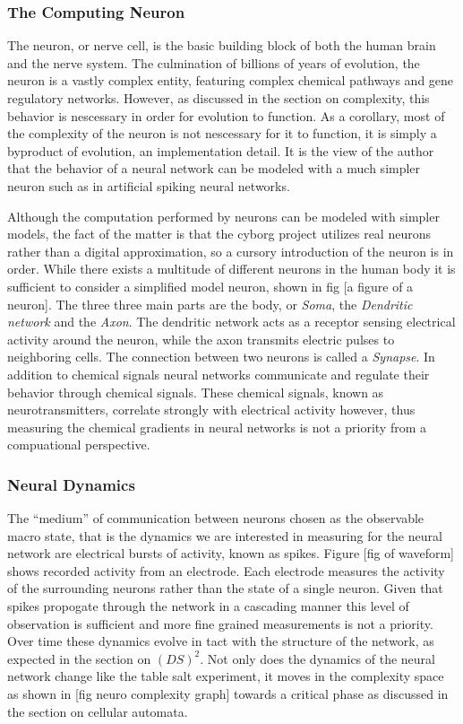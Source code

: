 \subsubsection{The Computing Neuron}
The neuron, or nerve cell, is the basic building block of both the human brain
and the nerve system.
The culmination of billions of years of evolution, the neuron is a vastly
complex entity, featuring complex chemical pathways and gene regulatory
networks.
However, as discussed in the section on complexity, this behavior is nescessary
in order for evolution to function.
As a corollary, most of the complexity of the neuron is not nescessary for it to
function, it is simply a byproduct of evolution, an implementation detail.
It is the view of the author that the behavior of a neural network can be
modeled with a much simpler neuron such as in artificial spiking neural
networks.\par
Although the computation performed by neurons can be modeled with simpler
models, the fact of the matter is that the cyborg project utilizes real neurons
rather than a digital approximation, so a cursory introduction of the neuron is
in order.
While there exists a multitude of different neurons in the human body it is
sufficient to consider a simplified model neuron, shown in fig [a figure of a
neuron].
The three three main parts are the body, or \emph{Soma}, the \emph{Dendritic
  network} and the \emph{Axon}. 
The dendritic network acts as a receptor sensing electrical activity around the
neuron, while the axon transmits electric pulses to neighboring cells.
The connection between two neurons is called a \emph{Synapse}.
%
In addition to chemical signals neural networks communicate and regulate their
behavior through chemical signals.
These chemical signals, known as neurotransmitters, correlate strongly with
electrical activity however, thus measuring the chemical gradients in neural
networks is not a priority from a compuational perspective.
\subsubsection{Neural Dynamics}
The ``medium'' of communication between neurons chosen as the observable macro
state, that is the dynamics we are interested in measuring for the neural
network are electrical bursts of activity, known as spikes.
Figure [fig of waveform] shows recorded activity from an electrode.
Each electrode measures the activity of the surrounding neurons rather than the
state of a single neuron.
Given that spikes propogate through the network in a cascading manner this
level of observation is sufficient and more fine grained measurements is not a
priority.
Over time these dynamics evolve in tact with the structure of the network, as
expected in the section on $(DS)^2$.
Not only does the dynamics of the neural network change like the table salt
experiment, it moves in the complexity space as shown in [fig neuro complexity
graph] towards a critical phase as discussed in the section on cellular automata.
%
